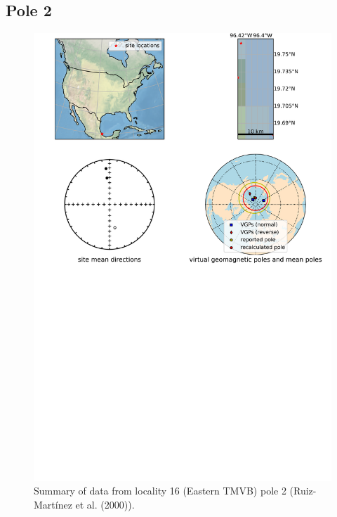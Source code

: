 \documentclass{article}
\begin{document}
\subsection{Pole 2}


\begin{figure}[H]
\centering
\includegraphics[width=5 in]{./16/2/pole_summary.png}
\caption{Summary of data from locality 16 (Eastern TMVB) pole 2 (Ruiz-Martínez et al. (2000)).}
\end{figure}
\end{document}
